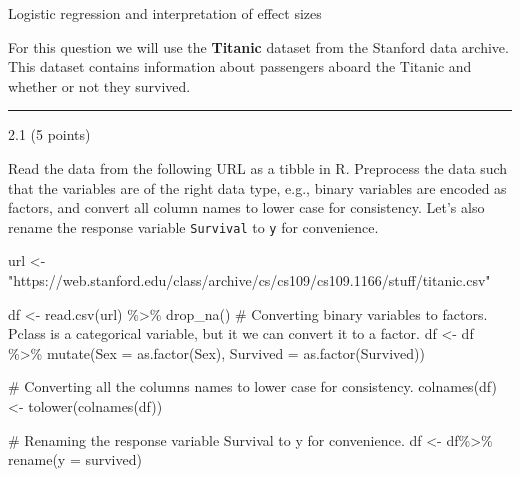 \documentclass[
  letterpaper,
  DIV=11,
  numbers=noendperiod]{scrartcl}
\newenvironment{Shaded}{\begin{snugshade}}{\end{snugshade}}
\newcommand{\AttributeTok}[1]{\textcolor[rgb]{0.40,0.45,0.13}{#1}}
\newcommand{\CommentTok}[1]{\textcolor[rgb]{0.37,0.37,0.37}{#1}}
\newcommand{\FunctionTok}[1]{\textcolor[rgb]{0.28,0.35,0.67}{#1}}
\newcommand{\NormalTok}[1]{\textcolor[rgb]{0.00,0.23,0.31}{#1}}
\newcommand{\OtherTok}[1]{\textcolor[rgb]{0.00,0.23,0.31}{#1}}
\newcommand{\SpecialCharTok}[1]{\textcolor[rgb]{0.37,0.37,0.37}{#1}}
\newcommand{\StringTok}[1]{\textcolor[rgb]{0.13,0.47,0.30}{#1}}
\begin{document}
\begin{tcolorbox}[enhanced jigsaw, breakable, colframe=quarto-callout-tip-color-frame, bottomtitle=1mm, leftrule=.75mm, bottomrule=.15mm, arc=.35mm, titlerule=0mm, coltitle=black, colback=white, colbacktitle=quarto-callout-tip-color!10!white, opacitybacktitle=0.6, toptitle=1mm, opacityback=0, title=\textcolor{quarto-callout-tip-color}{\faLightbulb}\hspace{0.5em}{50 points}, toprule=.15mm, left=2mm, rightrule=.15mm]

Logistic regression and interpretation of effect sizes

\end{tcolorbox}

For this question we will use the \textbf{Titanic} dataset from the
Stanford data archive. This dataset contains information about
passengers aboard the Titanic and whether or not they survived.

\begin{center}\rule{0.5\linewidth}{0.5pt}\end{center}

2.1 (5 points)

Read the data from the following URL as a tibble in R. Preprocess the
data such that the variables are of the right data type, e.g., binary
variables are encoded as factors, and convert all column names to lower
case for consistency. Let's also rename the response variable
\texttt{Survival} to \texttt{y} for convenience.

\begin{Shaded}
\begin{Highlighting}[]
\NormalTok{url }\OtherTok{\textless{}{-}} \StringTok{"https://web.stanford.edu/class/archive/cs/cs109/cs109.1166/stuff/titanic.csv"}

\NormalTok{df }\OtherTok{\textless{}{-}} \FunctionTok{read.csv}\NormalTok{(url) }\SpecialCharTok{\%\textgreater{}\%}
  \FunctionTok{drop\_na}\NormalTok{()}
\CommentTok{\# Converting binary variables to factors. Pclass is a categorical variable, but it we can convert it to a factor.  }
\NormalTok{df }\OtherTok{\textless{}{-}}\NormalTok{ df }\SpecialCharTok{\%\textgreater{}\%}
  \FunctionTok{mutate}\NormalTok{(}\AttributeTok{Sex =} \FunctionTok{as.factor}\NormalTok{(Sex),}
         \AttributeTok{Survived =} \FunctionTok{as.factor}\NormalTok{(Survived))}

\CommentTok{\# Converting all the columns names to lower case for consistency. }
\FunctionTok{colnames}\NormalTok{(df) }\OtherTok{\textless{}{-}} \FunctionTok{tolower}\NormalTok{(}\FunctionTok{colnames}\NormalTok{(df))}

\CommentTok{\# Renaming the response variable \textasciigrave{}Survival\textasciigrave{} to \textasciigrave{}y\textasciigrave{} for convenience. }
\NormalTok{df }\OtherTok{\textless{}{-}}\NormalTok{ df}\SpecialCharTok{\%\textgreater{}\%}
  \FunctionTok{rename}\NormalTok{(}\AttributeTok{y =}\NormalTok{ survived)}
\end{Highlighting}
\end{Shaded}
\end{document}
